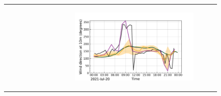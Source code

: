 \begin{figure}[hbtp]
\begin{tabular}{cc}
\begin{subfigure}[t]{0.5\textwidth}
        \end{subfigure} &
        \begin{subfigure}[t]{0.5\textwidth}
            \caption{}
            \includegraphics[width=\textwidth]{images/chap5/IOP_TS/TS_2021-07-20_elsplans_wind_direction_10m.png}
        \end{subfigure} \\
    \end{tabular}
    \caption{}
    \label{fig:iop_days_TS_surfvars_elsplans}
\end{figure}

